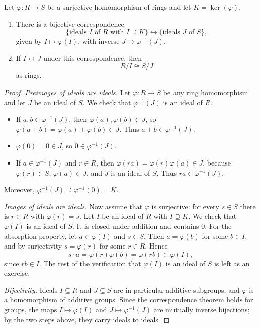 \documentclass[reqno,11pt]{amsart}
\begin{document}
\begin{theorem}\label{thm:correspondence}
Let $\varphi:R\to S$ be a surjective homomorphism of rings and let
$K=\ker(\varphi)$.
\begin{enumerate}
  \item There is a bijective correspondence
  \[
    \{\text{ideals }I\text{ of }R\text{ with }I\supseteq K\}
    \longleftrightarrow
    \{\text{ideals }J\text{ of }S\},
  \]
  given by $I\mapsto\varphi(I)$, with inverse $J\mapsto\varphi^{-1}(J)$.
  \item If $I\leftrightarrow J$ under this correspondence, then
  \[
    R/I\cong S/J
  \]
  as rings.
\end{enumerate}
\end{theorem}
\begin{proof}
\emph{Preimages of ideals are ideals.}
Let $\varphi:R\to S$ be any ring homomorphism and let $J$ be an
ideal of $S$. We check that $\varphi^{-1}(J)$ is an ideal of $R$.
\begin{itemize}
  \item If $a,b\in\varphi^{-1}(J)$, then $\varphi(a),\varphi(b)\in J$,
  so $\varphi(a+b)=\varphi(a)+\varphi(b)\in J$. Thus
  $a+b\in\varphi^{-1}(J)$.
  \item $\varphi(0)=0\in J$, so $0\in\varphi^{-1}(J)$.
  \item If $a\in\varphi^{-1}(J)$ and $r\in R$, then
  $\varphi(ra)=\varphi(r)\varphi(a)\in J$, because $\varphi(r)\in S$,
  $\varphi(a)\in J$, and $J$ is an ideal of $S$. Thus
  $ra\in\varphi^{-1}(J)$.
\end{itemize}
Moreover, $\varphi^{-1}(J)\supseteq\varphi^{-1}(0)=K$.

\emph{Images of ideals are ideals.}
Now assume that $\varphi$ is surjective: for every $s\in S$ there is
$r\in R$ with $\varphi(r)=s$. Let $I$ be an ideal of $R$ with
$I\supseteq K$. We check that $\varphi(I)$ is an ideal of $S$.
It is closed under addition and contains $0$. For the absorption
property, let $a\in\varphi(I)$ and $s\in S$. Then $a=\varphi(b)$ for
some $b\in I$, and by surjectivity $s=\varphi(r)$ for some $r\in R$.
Hence
\[
  s\cdot a=\varphi(r)\varphi(b)=\varphi(r b)\in\varphi(I),
\]
since $rb\in I$. The rest of the verification that $\varphi(I)$ is
an ideal of $S$ is left as an exercise.

\emph{Bijectivity.}
Ideals $I\subseteq R$ and $J\subseteq S$ are in particular additive
subgroups, and $\varphi$ is a homomorphism of additive groups.
Since the correspondence theorem holds for groups, the maps
$I\mapsto\varphi(I)$ and $J\mapsto\varphi^{-1}(J)$ are mutually
inverse bijections; by the two steps above, they carry ideals to
ideals.


\end{proof}
\end{document}
